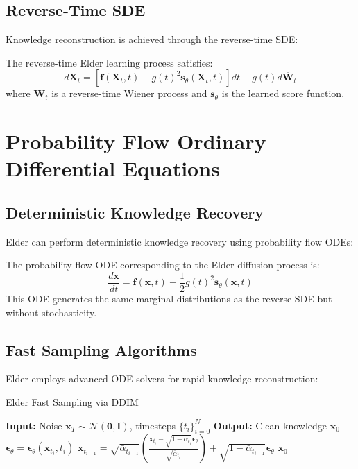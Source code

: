 \subsection{Reverse-Time SDE}

Knowledge reconstruction is achieved through the reverse-time SDE:

\begin{theorem}
The reverse-time Elder learning process satisfies:
\begin{equation}
d\mathbf{X}_t = [\mathbf{f}(\mathbf{X}_t, t) - g(t)^2 \mathbf{s}_\theta(\mathbf{X}_t, t)] dt + g(t) d\overline{\mathbf{W}}_t
\end{equation}
where $\overline{\mathbf{W}}_t$ is a reverse-time Wiener process and $\mathbf{s}_\theta$ is the learned score function.
\end{theorem}

\section{Probability Flow Ordinary Differential Equations}

\subsection{Deterministic Knowledge Recovery}

Elder can perform deterministic knowledge recovery using probability flow ODEs:

\begin{definition}
The probability flow ODE corresponding to the Elder diffusion process is:
\begin{equation}
\frac{d\mathbf{x}}{dt} = \mathbf{f}(\mathbf{x}, t) - \frac{1}{2} g(t)^2 \mathbf{s}_\theta(\mathbf{x}, t)
\end{equation}
This ODE generates the same marginal distributions as the reverse SDE but without stochasticity.
\end{definition}

\subsection{Fast Sampling Algorithms}

Elder employs advanced ODE solvers for rapid knowledge reconstruction:

\begin{algorithm}[H]
\caption{Elder Fast Sampling via DDIM}
\begin{algorithmic}[1]
\STATE \textbf{Input:} Noise $\mathbf{x}_T \sim \mathcal{N}(\mathbf{0}, \mathbf{I})$, timesteps $\{t_i\}_{i=0}^N$
\STATE \textbf{Output:} Clean knowledge $\mathbf{x}_0$
    \STATE $\boldsymbol{\epsilon}_\theta = \boldsymbol{\epsilon}_\theta(\mathbf{x}_{t_i}, t_i)$
    \STATE $\mathbf{x}_{t_{i-1}} = \sqrt{\bar{\alpha}_{t_{i-1}}} \left( \frac{\mathbf{x}_{t_i} - \sqrt{1-\bar{\alpha}_{t_i}} \boldsymbol{\epsilon}_\theta}{\sqrt{\bar{\alpha}_{t_i}}} \right) + \sqrt{1-\bar{\alpha}_{t_{i-1}}} \boldsymbol{\epsilon}_\theta$
\ENDFOR
\RETURN $\mathbf{x}_0$
\end{algorithmic}
\end{algorithm}

